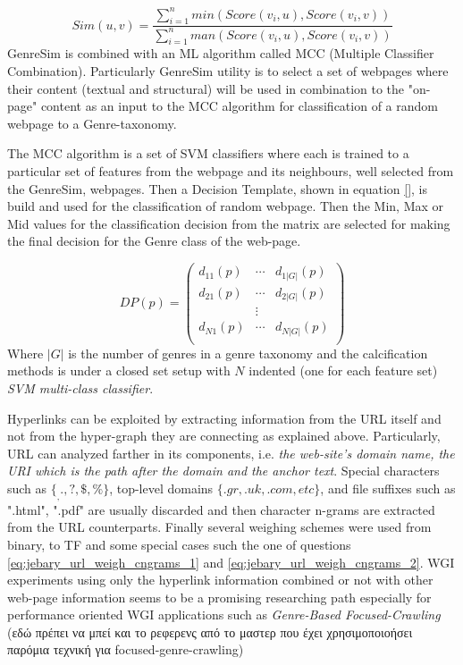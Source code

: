 \begin{equation}\label{eq:GenreSim_Selection_Score}
	Sim(u, v) = \frac{\sum_{i=1}^{n} min(Score(v_{i}, u), Score(v_{i}, v))}{\sum_{i=1}^{n} man(Score(v_{i}, u), Score(v_{i}, v))}
\end{equation}
GenreSim is combined with an ML algorithm called MCC (Multiple Classifier Combination). Particularly GenreSim utility is to select a set of webpages where their content (textual and structural) will be used in combination to the "on-page" content as an input to the MCC algorithm for classification of a random webpage to a Genre-taxonomy.

The MCC algorithm is a set of SVM classifiers where each is trained to a particular set of features from the webpage and its neighbours, well selected from the GenreSim, webpages. Then a Decision Template, shown in equation \ref{}, is build and used for the classification of random webpage. Then the Min, Max or Mid values for the classification decision from the matrix are selected for making the final decision for the Genre class of the web-page.

\begin{equation}\label{eq:GenreSim_DP}
	DP(p) = \left(
    	\begin{array}{ccc}
        	d_{11} (p) & \cdots & d_{1|G|} (p) \\
            d_{21} (p) & \cdots  & d_{2|G|} (p) \\
            & \vdots & \\
            d_{N1} (p) & \cdots  & d_{N|G|} (p) \\
         \end{array}
\right)
\end{equation}
Where $|G|$ is the number of genres in a genre taxonomy and the calcification methods is under a closed set setup with $N$ indented (one for each feature set) \textit{SVM multi-class classifier}. 

Hyperlinks can be exploited by extracting information from the URL itself and not from the hyper-graph they are connecting as explained above. Particularly, URL can analyzed farther in its components, i.e. \textit{the web-site's domain name, the URI which is the path after the domain and the anchor text}. Special characters such as $\{_ , . , ?, \$ , \%\}$, top-level domains $\{.gr , .uk , .com, etc\}$, and file suffixes such as ".html", ".pdf" are usually discarded and then character n-grams are extracted from the URL counterparts. Finally several weighing schemes were used from binary, to TF and some special cases such the one of questions \ref{eq:jebary_url_weigh_cngrams_1} and \ref{eq:jebary_url_weigh_cngrams_2}. WGI experiments using only the hyperlink information combined or not with other web-page information seems to be a promising researching path especially for performance oriented WGI applications such as \textit{Genre-Based Focused-Crawling} \parencite{jebari2014pure_URL,jebari2015combination} (εδώ πρέπει να μπεί και το ρεφερενς από το μαστερ που έχει χρησιμοποιοήσει παρόμια τεχνική για focused-genre-crawling)

